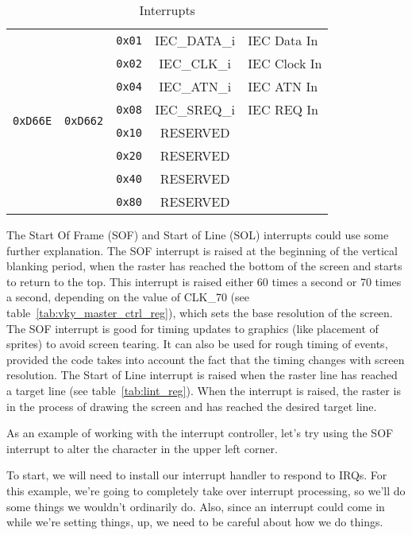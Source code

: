 \begin{table}[ht]
\begin{center}
\begin{tabular}{| c | c | c | c | l |}
            \multirow{8}{*}{{\tt 0xD66E}} & \multirow{8}{*}{{\tt 0xD662}} & \verb+0x01+ & IEC\_DATA\_i & IEC Data In \\ \cline{3-5}
            & & \verb+0x02+ & IEC\_CLK\_i & IEC Clock In  \\ \cline{3-5}
            & & \verb+0x04+ & IEC\_ATN\_i & IEC ATN In  \\ \cline{3-5}
            & & \verb+0x08+ & IEC\_SREQ\_i & IEC REQ In  \\ \cline{3-5}
            & & \verb+0x10+ & RESERVED & \\ \cline{3-5}
            & & \verb+0x20+ & RESERVED & \\ \cline{3-5}
            & & \verb+0x40+ & RESERVED & \\ \cline{3-5}
            & & \verb+0x80+ & RESERVED & \\ \hline
        \end{tabular}
    \end{center}
	\caption{Interrupts}
	\label{tab:interrupts}
\end{table}

The Start Of Frame (SOF) and Start of Line (SOL) interrupts could use some further explanation. The SOF interrupt is raised at the beginning of the vertical blanking period, when the raster has reached the bottom of the screen and starts to return to the top. This interrupt is raised either 60 times a second or 70 times a second, depending on the value of CLK\_70 (see table~\ref{tab:vky_master_ctrl_reg}), which sets the base resolution of the screen. The SOF interrupt is good for timing updates to graphics (like placement of sprites) to avoid screen tearing. It can also be used for rough timing of events, provided the code takes into account the fact that the timing changes with screen resolution. The Start of Line interrupt is raised when the raster line has reached a target line (see table~\ref{tab:lint_reg}). When the interrupt is raised, the raster is in the process of drawing the screen and has reached the desired target line.

As an example of working with the interrupt controller, let's try using the SOF interrupt to alter the character in the upper left corner.

To start, we will need to install our interrupt handler to respond to IRQs. For this example, we're going to completely take over interrupt processing, so we'll do some things we wouldn't ordinarily do. Also, since an interrupt could come in while we're setting things, up, we need to be careful about how we do things.

